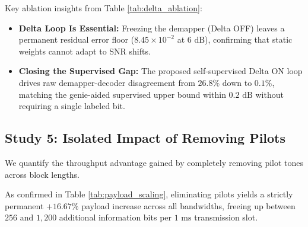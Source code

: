 \documentclass[journal]{IEEEtran}
\begin{document}
Key ablation insights from Table \ref{tab:delta_ablation}:
\begin{itemize}
    \item \textbf{Delta Loop Is Essential:} Freezing the demapper (Delta OFF) leaves a permanent residual error floor ($8.45 \times 10^{-2}$ at $6\text{ dB}$), confirming that static weights cannot adapt to SNR shifts.
    \item \textbf{Closing the Supervised Gap:} The proposed self-supervised Delta ON loop drives raw demapper-decoder disagreement from $26.8\%$ down to $0.1\%$, matching the genie-aided supervised upper bound within $0.2\text{ dB}$ without requiring a single labeled bit.
\end{itemize}

\subsection{Study 5: Isolated Impact of Removing Pilots}
We quantify the throughput advantage gained by completely removing pilot tones across block lengths.

\begin{table}[!t]
\caption{Payload Capacity Scaling: Zero-Pilot vs. Classical Baseline}
\label{tab:payload_scaling}
\centering
{}
\end{table}

As confirmed in Table \ref{tab:payload_scaling}, eliminating pilots yields a strictly permanent $+16.67\%$ payload increase across all bandwidths, freeing up between $256$ and $1,200$ additional information bits per $1\text{ ms}$ transmission slot.
\end{document}
